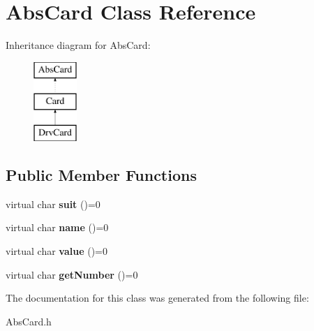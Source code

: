 \hypertarget{class_abs_card}{}\section{Abs\+Card Class Reference}
\label{class_abs_card}
Inheritance diagram for Abs\+Card\+:\begin{figure}[H]
\begin{center}
\leavevmode
\includegraphics[height=3.000000cm]{class_abs_card}
\end{center}
\end{figure}
\subsection*{Public Member Functions}
\begin{DoxyCompactItemize}
\item 
\mbox{\label{class_abs_card_ad52436ed07c6a42b4ee1024529ef0495}} 
virtual char {\bfseries suit} ()=0
\item 
\mbox{\label{class_abs_card_a358630141fc7bfc181cc877b643837fc}} 
virtual char {\bfseries name} ()=0
\item 
\mbox{\label{class_abs_card_a19683aa453039b6b9d703a8bc5bb4f68}} 
virtual char {\bfseries value} ()=0
\item 
\mbox{\label{class_abs_card_ae8fea85f0f6d58655137d6818d107638}} 
virtual char {\bfseries get\+Number} ()=0
\end{DoxyCompactItemize}


The documentation for this class was generated from the following file\+:\begin{DoxyCompactItemize}
\item 
Abs\+Card.\+h\end{DoxyCompactItemize}
